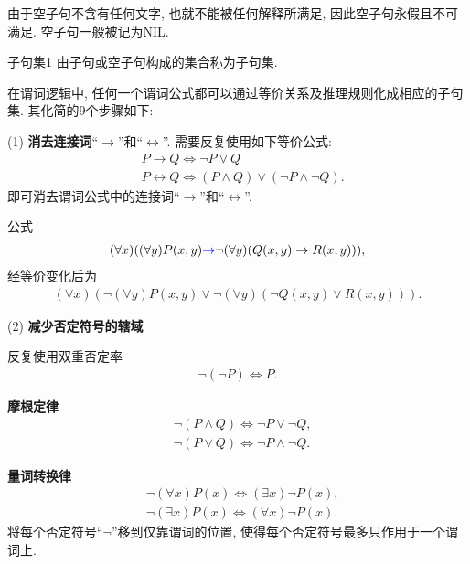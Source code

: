  由于空子句不含有任何文字, 也就不能被任何解释所满足, 因此空子句永假且不可满足.
空子句一般被记为NIL.

\begin{mydef}{子句集}{1}
   由子句或空子句构成的集合称为子句集.
\end{mydef}

在谓词逻辑中, 任何一个谓词公式都可以通过等价关系及推理规则化成相应的子句集. 其化简的9个步骤如下:

(1) \textbf{消去连接词}“$\rightarrow$”和“$\longleftrightarrow$”. 需要反复使用如下等价公式:
\begin{align}
    &P\rightarrow Q \Leftrightarrow \neg  P\vee Q\\
    &P\longleftrightarrow Q \Leftrightarrow  (P\wedge Q)\vee (\neg P\wedge \neg Q).
\end{align}
即可消去谓词公式中的连接词“$\rightarrow$”和“$\longleftrightarrow$”.

\begin{example}\label{C3exam3.64}公式
\begin{align}
    (\forall x)((\forall y)P(x,y)\textcolor[rgb]{0,0,1}{\rightarrow} \neg  (\forall y)(Q(x,y)\rightarrow R(x,y))),
\end{align}
经等价变化后为
\begin{align}\label{C3equa3.12}
    (\forall x)(\neg (\forall y)P(x,y)\vee \neg  (\forall y)(\neg Q(x,y)\vee R(x,y))).
\end{align}
\end{example}

(2) \textbf{减少否定符号的辖域}

反复使用双重否定率
\begin{align}
    \neg (\neg P) \Leftrightarrow  P.
\end{align}

\textbf{摩根定律}
\begin{align}
 &\neg (P\wedge Q) \Leftrightarrow \neg P\vee \neg Q,\\
 &\neg (P\vee Q) \Leftrightarrow \neg P\wedge \neg Q.
\end{align}

\textbf{量词转换律}
\begin{align}
  &\neg  (\forall x)P(x) \Leftrightarrow  (\exists  x) \neg P(x),\\
  &\neg  (\exists  x)P(x) \Leftrightarrow  (\forall x)\neg P(x).
\end{align}
将每个否定符号“$\neg$”移到仅靠谓词的位置, 使得每个否定符号最多只作用于一个谓词上.

